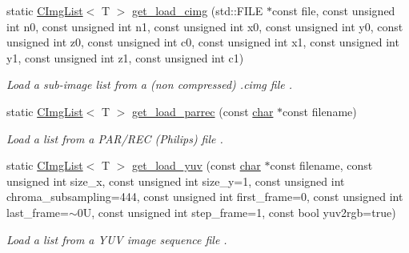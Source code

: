 \begin{DoxyCompactItemize}
\mbox{\label{structcimg__library__suffixed_1_1CImgList_a0224a8df3fb11e429d62562b61261da4}} 
static \hyperlink{structcimg__library__suffixed_1_1CImgList}{C\+Img\+List}$<$ T $>$ \hyperlink{structcimg__library__suffixed_1_1CImgList_a0224a8df3fb11e429d62562b61261da4}{get\+\_\+load\+\_\+cimg} (std\+::\+F\+I\+LE $\ast$const file, const unsigned int n0, const unsigned int n1, const unsigned int x0, const unsigned int y0, const unsigned int z0, const unsigned int c0, const unsigned int x1, const unsigned int y1, const unsigned int z1, const unsigned int c1)
\begin{DoxyCompactList}\small\item\em Load a sub-\/image list from a (non compressed) .cimg file . \end{DoxyCompactList}\item 
\mbox{\label{structcimg__library__suffixed_1_1CImgList_a632a4944b8de25accbe6581770bc3b16}} 
static \hyperlink{structcimg__library__suffixed_1_1CImgList}{C\+Img\+List}$<$ T $>$ \hyperlink{structcimg__library__suffixed_1_1CImgList_a632a4944b8de25accbe6581770bc3b16}{get\+\_\+load\+\_\+parrec} (const \hyperlink{classchar}{char} $\ast$const filename)
\begin{DoxyCompactList}\small\item\em Load a list from a P\+A\+R/\+R\+EC (Philips) file . \end{DoxyCompactList}\item 
\mbox{\label{structcimg__library__suffixed_1_1CImgList_a7ef2e8717b2624c864ec55ee6f1e5054}} 
static \hyperlink{structcimg__library__suffixed_1_1CImgList}{C\+Img\+List}$<$ T $>$ \hyperlink{structcimg__library__suffixed_1_1CImgList_a7ef2e8717b2624c864ec55ee6f1e5054}{get\+\_\+load\+\_\+yuv} (const \hyperlink{classchar}{char} $\ast$const filename, const unsigned int size\+\_\+x, const unsigned int size\+\_\+y=1, const unsigned int chroma\+\_\+subsampling=444, const unsigned int first\+\_\+frame=0, const unsigned int last\+\_\+frame=$\sim$0\+U, const unsigned int step\+\_\+frame=1, const bool yuv2rgb=true)
\begin{DoxyCompactList}\small\item\em Load a list from a Y\+UV image sequence file . \end{DoxyCompactList}\item 

\end{DoxyCompactItemize}
